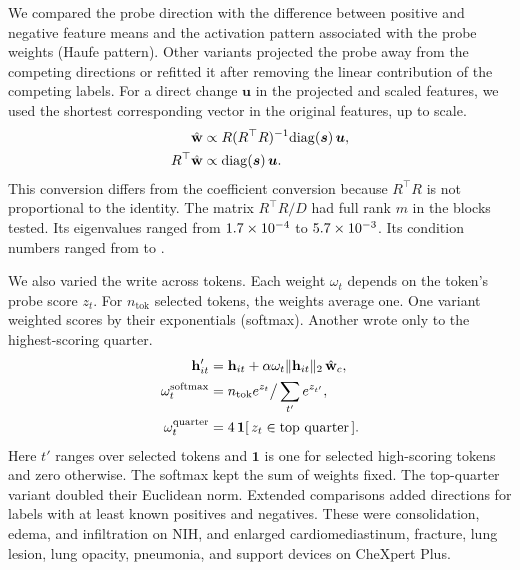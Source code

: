 We compared the probe direction with the difference between positive and negative feature means and the activation pattern associated with the probe weights (Haufe pattern).\cite{haufe2014interpretation} Other variants projected the probe away from the competing directions or refitted it after removing the linear contribution of the competing labels. For a direct change $\boldsymbol u$ in the projected and scaled features, we used the shortest corresponding vector in the original features, up to scale.
\begin{equation}
\begin{aligned}
\hat{\mathbf{w}} &\propto R(R^{\top}R)^{-1}
             \mathrm{diag}(\boldsymbol s)\,\boldsymbol u,\\
R^\top\hat{\mathbf{w}} &\propto \mathrm{diag}(\boldsymbol s)\,\boldsymbol u .
\end{aligned}
\label{eq:displacement-lift}
\end{equation}
This conversion differs from the coefficient conversion because $R^\top R$ is not proportional to the identity. The matrix $R^\top R/D$ had full rank $m$ in the \cfAltdirdBlocks{} blocks tested. Its eigenvalues ranged from $1.7\times10^{-4}$ to $5.7\times10^{-3}$. Its condition numbers ranged from \cfAltdirdCondMin{} to \cfAltdirdCondMax{}.

We also varied the write across tokens. Each weight $\omega_t$ depends on the token's probe score $z_t$. For $n_{\mathrm{tok}}$ selected tokens, the weights average one. One variant weighted scores by their exponentials (softmax). Another wrote only to the highest-scoring quarter.
\begin{equation}
\begin{aligned}
\mathbf{h}'_{it}&=\mathbf{h}_{it}+\alpha\omega_t\lVert\mathbf{h}_{it}\rVert_2\,\hat{\mathbf{w}}_c,\\
\omega_t^{\mathrm{softmax}}
  &=n_{\mathrm{tok}}e^{z_t}\big/\sum_{t'}e^{z_{t'}},\\
\omega_t^{\mathrm{quarter}}
  &=4\,\mathbf 1[\,z_t\in\text{top quarter}\,].
\end{aligned}
\label{eq:token-weights}
\end{equation}
Here $t'$ ranges over selected tokens and $\mathbf 1$ is one for selected high-scoring tokens and zero otherwise. The softmax kept the sum of weights fixed. The top-quarter variant doubled their Euclidean norm. Extended comparisons added directions for labels with at least \jnMinExtendedClassSupport{} known positives and negatives. These were consolidation, edema, and infiltration on NIH, and enlarged cardiomediastinum, fracture, lung lesion, lung opacity, pneumonia, and support devices on CheXpert Plus.

